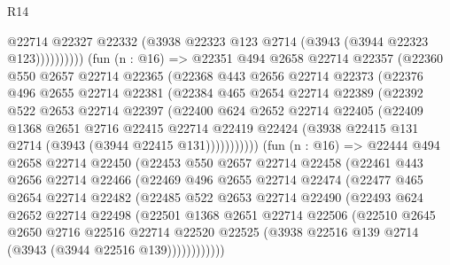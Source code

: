 \begin{lexlean}{R14}
\begin{coremodule}
                      @22714
                      @22327
                      @22332
                      (@3938 @22323 @123 @2714 (@3943 (@3944 @22323 @123))))))))))
        (fun (n : @16) =>
        @22351
          @494
          @2658
          @22714
          @22357
          (@22360
            @550
            @2657
            @22714
            @22365
            (@22368
              @443
              @2656
              @22714
              @22373
              (@22376
                @496
                @2655
                @22714
                @22381
                (@22384
                  @465
                  @2654
                  @22714
                  @22389
                  (@22392
                    @522
                    @2653
                    @22714
                    @22397
                    (@22400
                      @624
                      @2652
                      @22714
                      @22405
                      (@22409
                        @1368
                        @2651
                        @2716
                        @22415
                        @22714
                        @22419
                        @22424
                        (@3938 @22415 @131 @2714 (@3943 (@3944 @22415 @131)))))))))))
        (fun (n : @16) =>
        @22444
          @494
          @2658
          @22714
          @22450
          (@22453
            @550
            @2657
            @22714
            @22458
            (@22461
              @443
              @2656
              @22714
              @22466
              (@22469
                @496
                @2655
                @22714
                @22474
                (@22477
                  @465
                  @2654
                  @22714
                  @22482
                  (@22485
                    @522
                    @2653
                    @22714
                    @22490
                    (@22493
                      @624
                      @2652
                      @22714
                      @22498
                      (@22501
                        @1368
                        @2651
                        @22714
                        @22506
                        (@22510
                          @2645
                          @2650
                          @2716
                          @22516
                          @22714
                          @22520
                          @22525
                          (@3938 @22516 @139 @2714 (@3943 (@3944 @22516 @139))))))))))))

\end{coremodule}
\end{lexlean}
